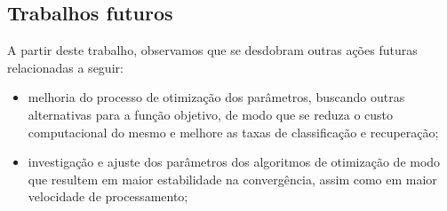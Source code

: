 \subsection{Trabalhos futuros}
A partir deste trabalho, observamos que se desdobram outras ações futuras relacionadas a seguir: 
\begin{itemize}

\item melhoria do processo de otimização dos parâmetros, buscando outras alternativas para a função objetivo, de modo que se reduza o custo computacional do mesmo e melhore as taxas de classificação e recuperação;

\item investigação e ajuste dos parâmetros dos algoritmos de otimização de modo que resultem em maior estabilidade na convergência, assim como em maior velocidade de processamento;

\end{itemize}



